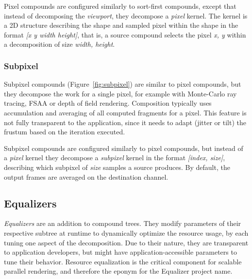 \documentclass[10pt,journal,compsoc]{IEEEtran}
\newcommand{\fig}[1]{Figure~\ref{#1}}
\providecommand{\DIFaddtex}[1]{{\protect\color{blue} \sf #1}} %
\providecommand{\DIFaddbegin}{} %
\providecommand{\DIFaddend}{} %
\providecommand{\DIFadd}[1]{\texorpdfstring{\DIFaddtex{#1}}{#1}} %
\newcommand{\DIFaddincludegraphics}[2][]{{\color{blue}\fbox{\DIFOincludegraphics[#1]{#2}}}} %
\DeclareRobustCommand{\DIFaddbegin}{\DIFOaddbegin \let\includegraphics\DIFaddincludegraphics} %
\DeclareRobustCommand{\DIFaddend}{\DIFOaddend \let\includegraphics\DIFOincludegraphics} %
\begin{document}
\DIFaddbegin \DIFadd{Pixel compounds are configured similarly to sort-first compounds, except that
instead of decomposing the \textit{viewport}, they decompose a \textit{pixel}
kernel. The kernel is a 2D structure describing the shape and sampled pixel
within the shape in the format \textit{[x y width height]}, that is, a source
compound selects the pixel \textit{x, y} within a decomposition of size
\textit{width, height}.
}

\DIFaddend \subsubsection{Subpixel}

Subpixel compounds (\fig{fig:subpixel}) are similar to pixel compounds, but they
decompose the work for a single pixel, for example with Monte-Carlo ray tracing,
FSAA or depth of field rendering. Composition typically uses accumulation and
averaging of all computed fragments for a pixel. This feature is not fully
transparent to the application, since it needs to adapt (jitter or tilt) the
frustum based on the iteration executed.

\DIFaddbegin \DIFadd{Subpixel compounds are configured similarly to pixel compounds, but instead of
a \textit{pixel} kernel they decompose a \textit{subpixel} kernel in the format
\textit{[index, size]}, describing which subpixel of \textit{size} samples a
source produces. By default, the output frames are averaged on the destination
channel.
}\DIFaddend 

\subsection{Equalizers}

{\em Equalizers} are an addition to compound trees. They modify parameters of
their respective subtree at runtime to dynamically optimize the resource usage,
by each tuning one aspect of the decomposition. Due to their nature, they are
transparent to application developers, but might have application-accessible
parameters to tune their behavior. Resource equalization is the critical
component for scalable parallel rendering, and therefore the eponym for the
\textsf{Equalizer} project name.
\end{document}
